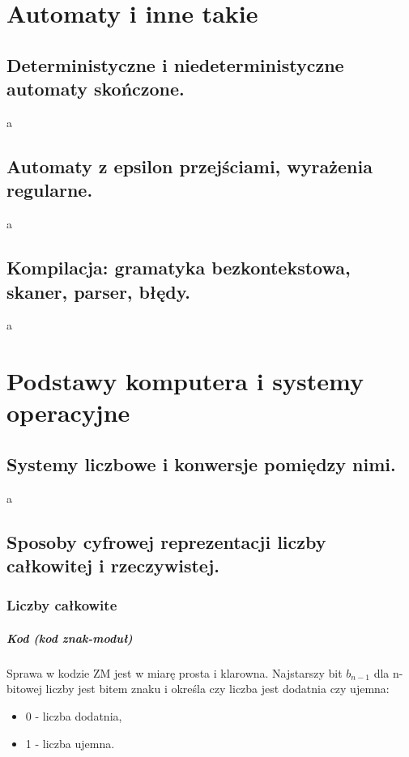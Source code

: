 \documentclass[a4paper,12pt,oneside]{book}
\begin{document}
		\newpage\section{Automaty i inne takie}
			\subsection{\color{red}Deterministyczne i niedeterministyczne automaty skończone.}
				a
			\newpage\subsection{\color{red}Automaty z epsilon przejściami, wyrażenia regularne.}
				a
			\newpage\subsection{\color{red}Kompilacja: gramatyka bezkontekstowa, skaner, parser, błędy.}
				a
		
		\newpage\section{Podstawy komputera i systemy operacyjne}
			\subsection{\color{red}Systemy liczbowe i konwersje pomiędzy nimi.}
			
				a
				
			\newpage\subsection{Sposoby cyfrowej reprezentacji liczby całkowitej i rzeczywistej.}
			
				\subsubsection{Liczby całkowite}
				
				\subparagraph{Kod  (kod znak-moduł)}
				
				Sprawa w kodzie ZM jest w miarę prosta i klarowna. Najstarszy bit $b_{n-1}$ dla n-bitowej liczby jest bitem znaku i określa czy liczba jest dodatnia czy ujemna:
				\begin{itemize}
					\item 0 - liczba dodatnia,
					\item 1 - liczba ujemna.
				\end{itemize}
				
\end{document}
